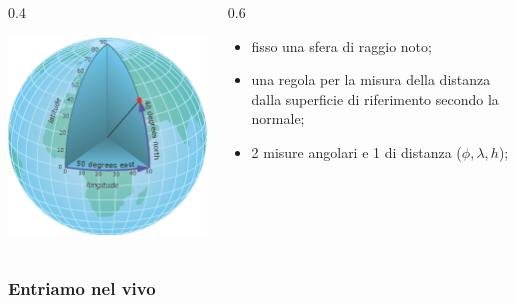 \documentclass{beamer}
\begin{document}
{\begin{frame}
    \begin{columns}	
          \begin{column} {0.4\textwidth}
          \begin{center}
              \includegraphics[width=\textwidth] {./pics_2022_03/latlon.png}	
          \end{center}
          
      \end{column}
      \begin{column} {0.6\textwidth}
         \begin{itemize}
              \item fisso una sfera di raggio noto;
              \item una regola per la misura della distanza dalla superficie di
              riferimento secondo la normale;
              \item 2 misure angolari e 1 di distanza ($\phi, \lambda, h$);
         \end{itemize}
      \end{column}
  \end{columns}

\end{frame}

\begin{frame}
   \frametitle{Entriamo nel vivo}


\end{frame}}
\end{document}
